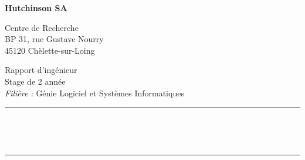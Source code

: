 \begin{multicols}{2}
\begin{flushright}
		\textbf{Hutchinson SA}
		
		\vspace*{0.5cm}
		
		Centre de Recherche													\\
		BP 31, rue Gustave Nourry											\\
		45120 Chèlette-sur-Loing
		
		
	\end{flushright}
\end{multicols}

\vspace*{\fill}

\begin{center}


	\Large
	Rapport d'ingénieur													\\
	Stage de 2 année												\\
	\textit{Filière :} Génie Logiciel et Systèmes Informatiques
	
	\rule{16cm}{2pt}													\\
	\vspace*{0.35cm}
	
	\huge
	\textbf{\@title}													\\

	\rule{16cm}{2pt}
	

\end{center}
	
\vspace*{\fill}

